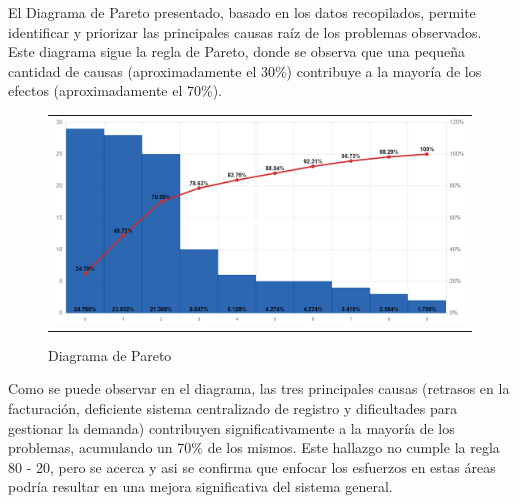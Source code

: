
El Diagrama de Pareto presentado, basado en los datos recopilados, permite identificar y priorizar las principales causas raíz de los problemas observados. Este diagrama sigue la regla de Pareto, donde se observa que una pequeña cantidad de causas (aproximadamente el 30\%) contribuye a la mayoría de los efectos (aproximadamente el 70\%).

\begin{figure}[H]
    \caption[Diagrama de Pareto]{Diagrama de Pareto}
    \begin{tabular}{c}
        \includegraphics[width=1\textwidth]{imagenes/cap3/diagrama-de-paretoMEj.png}
    \end{tabular}
    \label{fig:diagramaPareto}
\end{figure}

Como se puede observar en el diagrama, las tres principales causas (retrasos en la facturación, deficiente sistema centralizado de registro y dificultades para gestionar la demanda) contribuyen significativamente a la mayoría de los problemas, acumulando un 70\% de los mismos. Este hallazgo no cumple la regla 80 - 20, pero se acerca y asi se confirma que enfocar los esfuerzos en estas áreas podría resultar en una mejora significativa del sistema general.


